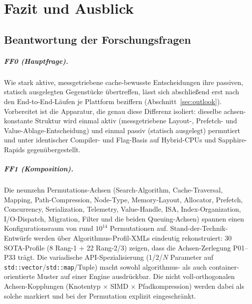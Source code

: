 \chapter{Fazit und Ausblick}\label{ch:conclusion}

\section{Beantwortung der Forschungsfragen}\label{sec:answers}

\paragraph{FF0 (Hauptfrage).} Wie stark aktive, messgetriebene cache-bewusste Entscheidungen ihre
passiven, statisch ausgelegten Gegenstücke übertreffen, lässt sich abschließend erst nach den
End-to-End-Läufen je Plattform beziffern (Abschnitt~\ref{sec:outlook}). Vorbereitet ist die
Apparatur, die genau diese Differenz isoliert: dieselbe achsen-konstante Struktur wird einmal aktiv
(messgetriebene Layout-, Prefetch- und Value-Ablage-Entscheidung) und einmal passiv (statisch
ausgelegt) permutiert und unter identischer Compiler- und Flag-Basis auf Hybrid-CPUs und
Sapphire-Rapids gegenübergestellt.

\paragraph{FF1 (Komposition).} Die neunzehn Permutations-Achsen (Search-Algorithm,
Cache-Traversal, Mapping, Path-Compression, Node-Type, Memory-Layout, Allocator, Prefetch,
Concurrency, Serialization, Telemetry, Value-Handle, ISA, Index-Organization, I/O-Dispatch,
Migration, Filter und die beiden Queuing-Achsen) spannen einen Konfigurationsraum von rund
$10^{14}$ Permutationen auf. Stand-der-Technik-Entwürfe werden über Algorithmus-Profil-XMLs
eindeutig rekonstruiert: 30 SOTA-Profile (8 Rang-1 + 22 Rang-2/3) zeigen, dass die Achsen-Zerlegung
P01--P33 trägt. Die variadische API-Spezialisierung (1/2/$N$ Parameter auf
\texttt{std::vector}/\texttt{std::map}/Tuple) macht sowohl algorithmus- als auch
container-orientierte Muster auf einer Engine ausdrückbar. Die nicht voll-orthogonalen
Achsen-Kopplungen (Knotentyp $\times$ SIMD $\times$ Pfadkompression) werden dabei als solche
markiert und bei der Permutation explizit eingeschränkt.

